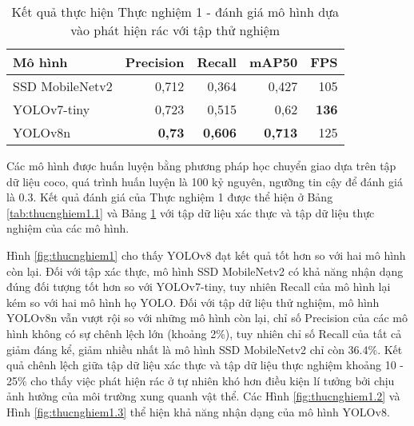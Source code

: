 \documentclass[../the.tex]{subfiles}
\begin{document}
\begin{table}[h!]
    \centering
    \caption{Kết quả thực hiện Thực nghiệm 1 - đánh giá mô hình dựa vào phát hiện rác với tập thử nghiệm}
    \begin{tabular}{|l|r|r|r|r|}
        \hline
        \textbf{Mô hình} & \textbf{Precision} & \textbf{Recall} & \textbf{mAP50} & \multicolumn{1}{l|}{\textbf{FPS}} \\ \hline
        SSD MobileNetv2  & 0,712              & 0,364           & 0,427          & 105                               \\ \hline
        YOLOv7-tiny      & 0,723              & 0,515           & 0,62           & \textbf{136}                      \\ \hline
        YOLOv8n          & \textbf{0,73}      & \textbf{0,606}  & \textbf{0,713} & 125                               \\ \hline
    \end{tabular}
    \label{tab:thucnghiem1.2}
\end{table}

{\fontsize{13}{12} \selectfont

Các mô hình được huấn luyện bằng phương pháp học chuyển giao dựa trên tập dữ liệu coco, quá trình huấn luyện là 100 kỷ nguyên, ngưỡng tin cậy để đánh giá là 0.3.
Kết quả đánh giá của Thực nghiệm 1 được thể hiện ở Bảng \ref{tab:thucnghiem1.1}
và Bảng \ref{tab:thucnghiem1.2} với tập dữ liệu xác thực và tập dữ liệu thực nghiệm của các mô hình.

}

\bigskip

{\fontsize{13}{12} \selectfont

    Hình \ref{fig:thucnghiem1} cho thấy YOLOv8 đạt kết quả tốt hơn so với hai mô hình còn lại. Đối với tập xác thực, mô hình SSD MobileNetv2 có khả năng nhận dạng đúng đối tượng tốt hơn so với YOLOv7-tiny, tuy nhiên Recall của mô hình lại kém so với hai mô hình họ YOLO.
    Đối với tập dữ liệu thử nghiệm, mô hình YOLOv8n vẫn vượt rội so với những mô hình còn lại, chỉ số Precision của các mô hình không có sự chênh lệch lớn (khoảng 2\%), tuy nhiên chỉ số Recall của tất cả giảm đáng kể, giảm nhiều nhất là mô hình SSD MobileNetv2 chỉ còn 36.4\%.
    Kết quả chênh lệch giữa tập dữ liệu xác thực và tập dữ liệu thực nghiệm khoảng 10 - 25\% cho thấy việc phát hiện rác ở tự nhiên khó hơn điều kiện lí tưởng bởi chịu ảnh hưởng của môi trường xung quanh vật thể.
    Các Hình \ref{fig:thucnghiem1.2} và Hình \ref{fig:thucnghiem1.3} thể hiện khả năng nhận dạng của mô hình YOLOv8.

}
\end{document}
